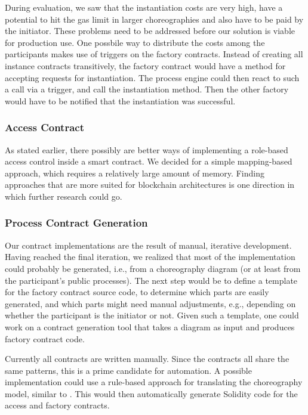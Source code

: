 \documentclass[runningheads]{llncs}
\begin{document}
During evaluation, we saw that the instantiation costs are very high, have a potential to hit the gas limit in larger choreographies and also have to be paid by the initiator.
These problems need to be addressed before our solution is viable for production use.
One possbile way to distribute the costs among the participants makes use of triggers on the factory contracts.
Instead of creating all instance contracts transitively, the factory contract would have a method for accepting requests for instantiation.
The process engine could then react to such a call via a trigger, and call the instantiation method.
Then the other factory would have to be notified that the instantiation was successful.

\subsubsection{Access Contract}

As stated earlier, there possibly are better ways of implementing a role-based access control inside a smart contract.
We decided for a simple mapping-based approach, which requires a relatively large amount of memory.
Finding approaches that are more suited for blockchain architectures is one direction in which further research could go.

\subsubsection{Process Contract Generation}

Our contract implementations are the result of manual, iterative development.
Having reached the final iteration, we realized that most of the implementation could probably be generated, i.e., from a choreography diagram (or at least from the participant's public processes).
The next step would be to define a template for the factory contract source code, to determine which parts are easily generated, and which parts might need manual adjustments, e.g., depending on whether the participant is the initiator or not.
Given such a template, one could work on a contract generation tool that takes a diagram as input and produces factory contract code.

Currently all contracts are written manually.
Since the contracts all share the same patterns,  this is a prime candidate for automation.
A possible implementation could use a rule-based approach for translating the choreography model, similar to \cite{lopez2017caterpillar}.
This would then automatically generate Solidity code for the access and factory contracts.
\end{document}
